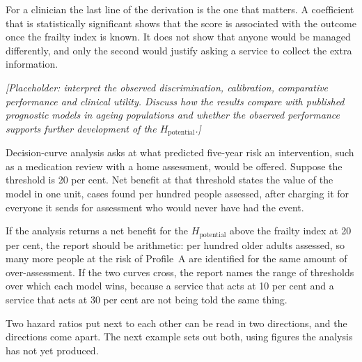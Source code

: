 \noindent For a clinician the last line of the derivation is the one that
matters. A coefficient that is statistically significant shows that the score is
associated with the outcome once the frailty index is known. It does not show
that anyone would be managed differently, and only the second would justify
asking a service to collect the extra information.

\medskip
\noindent\emph{[Placeholder: interpret the observed discrimination, calibration, comparative performance and clinical utility. Discuss how the results compare with published prognostic models in ageing populations and whether the observed performance supports further development of the $H_{\text{potential}}$.]}

\begin{reading}
Decision-curve analysis asks at what predicted five-year risk an intervention,
such as a medication review with a home assessment, would be offered. Suppose
the threshold is 20 per cent. Net benefit at that threshold states the value of the model in one unit,
cases found per hundred people assessed, after charging it for everyone it sends
for assessment who would never have had the event.

If the analysis returns a net benefit for the $H_{\text{potential}}$ above the
frailty index at 20 per cent, the report should be arithmetic: per hundred older
adults assessed, so many more people at the risk of Profile~A are identified for
the same amount of over-assessment. If the two curves cross, the report names the range of
thresholds over which each model wins, because a service that acts at 10 per cent
and a service that acts at 30 per cent are not being told the same thing.
\end{reading}

Two hazard ratios put next to each other can be read in two directions, and
the directions come apart. The next example sets out both, using figures the
analysis has not yet produced.

